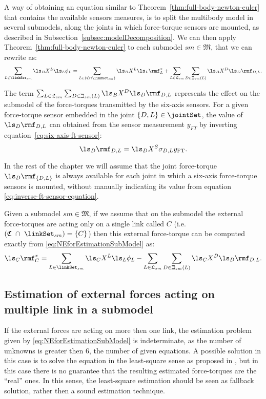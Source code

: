 A way of obtaining an equation similar to Theorem~\ref{thm:full-body-newton-euler}  that contains the available sensors measures, is to split the multibody model in several submodels, along the joints in which force-torque sensors are mounted, as described in Subsection~\ref{subsec:modelDecomposition}. We can then apply Theorem~\ref{thm:full-body-newton-euler} to each submodel $sm \in \mathfrak{M}$, that we can rewrite as:
\begin{equation}
    \label{eq:NEforEstimationSubModel}
    \sum_{L \in \linkSet_{sm}}  \ls_B X^L \ls_L \phi_L = \sum_{L \in (\mathfrak{C} \cap \linkSet_{sm}) }  \ls_B X^L \ls_L \rmf^x_L +  \sum_{L \in \mathfrak{L}_{sm}} \sum_{D \in \beth_{sm}(L)}  \ls_B X^D \ls_D \rmf_{D,L} .
\end{equation}

The term $\sum_{L \in \mathfrak{L}_{sm}} \sum_{D \in \beth_{sm}(L)}  \ls_B X^D \ls_D \rmf_{D,L}$ represents the effect on the submodel of the force-torques transmitted by the six-axis sensors. For a given force-torque sensor embedded in the joint $\{D,L\} \in \jointSet$, the value of $\ls_D \rmf_{D,L}$ can obtained from the sensor measurement $y_{FT}$ by inverting equation~\eqref{eq:six-axis-ft-sensor}:
\begin{equation}
\label{eq:inverse-ft-sensor-equation}
\ls_D \rmf_{D,L} = \ls_D X^S \sigma_{D,L} y_{\text{FT}}.
\end{equation}

In the rest of the chapter we will assume that the joint force-torque $\ls_D \rmf_{\{D,L\}}$ is always available for each joint in which a six-axis force-torque sensors is mounted, without manually indicating its value from equation \eqref{eq:inverse-ft-sensor-equation}.

Given a submodel $sm \in \mathfrak{M}$, if we assume that on the submodel the external force-torques are acting only on a single link called $C$ (i.e. $(\mathfrak{C}~\cap~\linkSet_{sm}) = \{C\}$) then this external force-torque can be computed exactly from \eqref{eq:NEforEstimationSubModel} as:
\begin{equation}
   \ls_{C} \rmf^x_{C} =
   \sum_{L \in \linkSet_{sm}}  \ls_C X^L \ls_L \phi_L   -  \sum_{L \in \mathfrak{L}_{sm}} \sum_{D \in \beth_{sm}(L)}  \ls_C X^D \ls_D \rmf_{D,L} .
\end{equation}

\subsection{Estimation of external forces acting on multiple link in a submodel}
If the external forces are acting on more then one link, the estimation problem given by \eqref{eq:NEforEstimationSubModel} is indeterminate, as the number of unknowns is greater then 6, the number of given equations. A possible solution in this case is to solve the equation in the least-square sense as proposed in \cite{DelPrete2012}, but in this case there is no guarantee that the resulting estimated force-torques are the ``real'' ones. In this sense, the least-square estimation should be seen as fallback solution, rather then a sound estimation technique. 

